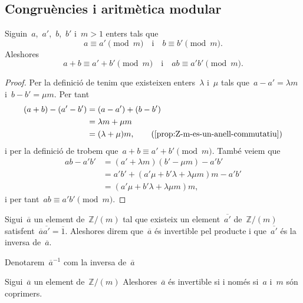\documentclass[../fonaments-de-les-matematiques.tex]{subfiles}
\begin{document}
    \subsection{Congruències i aritmètica modular}
    \begin{proposition}
        Siguin~\(a\),~\(a'\),~\(b\),~\(b'\) i~\(m>1\) enters tals que
        \[
            a\equiv a'\pmod{m}\quad\text{i}\quad b\equiv b'\pmod{m}.
        \]
        Aleshores
        \[
            a+b\equiv a'+b'\pmod{m}\quad\text{i}\quad ab\equiv a'b'\pmod{m}.
        \]
    \end{proposition}
    \begin{proof}
        Per la definició de  tenim que existeixen enters~\(\lambda\) i~\(\mu\) tals que~\(a-a'=\lambda m\) i~\(b-b'=\mu m\).
        Per tant
        \begin{align*}
        (a+b)-(a'-b')&=(a-a')+(b-b')\\
        &=\lambda m+\mu m\\
        &=(\lambda+\mu)m,\tag{\ref{prop:Z-m-es-un-anell-commutatiu}}
        \end{align*}
        i per la definició de  trobem que~\(a+b\equiv a'+b'\pmod{m}\).
        També veiem que
        \begin{align*}
        ab-a'b'&=(a'+\lambda m)(b'-\mu m)-a'b'\\
        &=a'b'+(a'\mu+b'\lambda+\lambda\mu m)m-a'b'\\
        &=(a'\mu+b'\lambda+\lambda\mu m)m,
        \end{align*}
        i per tant~\(ab\equiv a'b'\pmod{m}\).
    \end{proof}
    \begin{definition}
        \label{def:nombre-modular-invertible}
        Sigui~\(\overline{a}\) un element de~\(\mathbb{Z}/(m)\) tal que existeix un element~\(\overline{a'}\) de~\(\mathbb{Z}/(m)\) satisfent~\(\overline{a}\overline{a'}=\overline{1}\).
        Aleshores direm que~\(\overline{a}\) és invertible pel producte i que~\(\overline{a'}\) és la inversa de~\(\overline{a}\).

        Denotarem~\(\overline{a}^{-1}\) com la inversa de~\(\overline{a}\)
    \end{definition}
    \begin{proposition}
        \label{prop:condicio-equivalent-a-invertible-en-Z-m}
        Sigui~\(\overline{a}\) un element de~\(\mathbb{Z}/(m)\) Aleshores~\(\overline{a}\) és invertible si i només si~\(a\) i~\(m\) són coprimers.
    \end{proposition}
\end{document}
